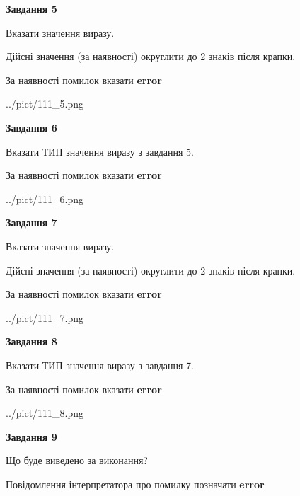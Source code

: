 \documentclass[11pt, ukrainian]{article}
\begin{document}
{\begin {large}
{\begin {center}\textbf{Завдання 5}\end {center}}\par
Вказати значення виразу. \par
Дійсні значення (за наявності) округлити до 2 знаків після крапки. \par
За наявності помилок вказати \textbf{error}

\begin{center}
	{../pict/111_5.png}
\end{center}
\newpage

{\begin {center}\textbf{Завдання 6}\end {center}}\par
Вказати ТИП значення виразу з завдання 5. \par
За наявності помилок вказати \textbf{error}

\begin{center}
	{../pict/111_6.png}
\end{center}
\newpage

{\begin {center}\textbf{Завдання 7}\end {center}}\par
Вказати значення виразу. \par
Дійсні значення (за наявності) округлити до 2 знаків після крапки. \par
За наявності помилок вказати \textbf{error}

\begin{center}
	{../pict/111_7.png}
\end{center}
\newpage

{\begin {center}\textbf{Завдання 8}\end {center}}\par
Вказати ТИП значення виразу з завдання 7. \par
За наявності помилок вказати \textbf{error}

\begin{center}
	{../pict/111_8.png}
\end{center}
\newpage

{\begin {center}\textbf{Завдання 9}\end {center}}\par
Що буде виведено за виконання? \par
Повідомлення інтерпретатора про помилку позначати \textbf{error}


\end{large}}
\end{document}
